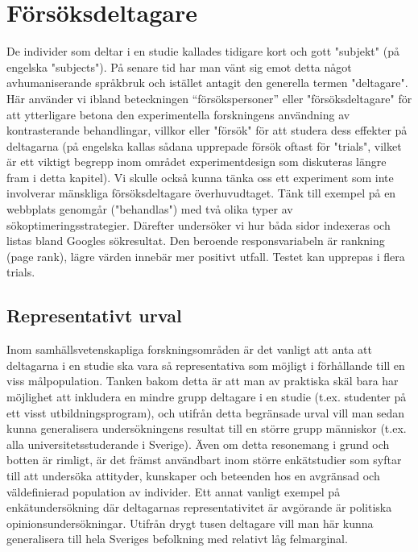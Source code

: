 \documentclass[
]{book}
\begin{document}
\hypertarget{sec07.2}{%
\section{Försöksdeltagare}\label{sec07.2}}

De individer som deltar i en studie kallades tidigare kort och gott "subjekt" (på engelska "subjects"). På senare tid har man vänt sig emot detta något avhumaniserande språkbruk och istället antagit den generella termen "deltagare". Här använder vi ibland beteckningen ``försökspersoner'' eller "försöksdeltagare" för att ytterligare betona den experimentella forskningens användning av kontrasterande behandlingar, villkor eller "försök" för att studera dess effekter på deltagarna (på engelska kallas sådana upprepade försök oftast för "trials", vilket är ett viktigt begrepp inom området experimentdesign som diskuteras längre fram i detta kapitel). Vi skulle också kunna tänka oss ett experiment som inte involverar mänskliga försöksdeltagare överhuvudtaget. Tänk till exempel på en webbplats genomgår ("behandlas") med två olika typer av sökoptimeringsstrategier. Därefter undersöker vi hur båda sidor indexeras och listas bland Googles sökresultat. Den beroende responsvariabeln är rankning (page rank), lägre värden innebär mer positivt utfall. Testet kan upprepas i flera trials.

\hypertarget{sub07.2.1}{%
\subsection{Representativt urval}\label{sub07.2.1}}

Inom samhällsvetenskapliga forskningsområden är det vanligt att anta att deltagarna i en studie ska vara så representativa som möjligt i förhållande till en viss målpopulation. Tanken bakom detta är att man av praktiska skäl bara har möjlighet att inkludera en mindre grupp deltagare i en studie (t.ex. studenter på ett visst utbildningsprogram), och utifrån detta begränsade urval vill man sedan kunna generalisera undersökningens resultat till en större grupp människor (t.ex. alla universitetsstuderande i Sverige). Även om detta resonemang i grund och botten är rimligt, är det främst användbart inom större enkätstudier som syftar till att undersöka attityder, kunskaper och beteenden hos en avgränsad och väldefinierad population av individer. Ett annat vanligt exempel på enkätundersökning där deltagarnas representativitet är avgörande är politiska opinionsundersökningar. Utifrån drygt tusen deltagare vill man här kunna generalisera till hela Sveriges befolkning med relativt låg felmarginal.
\end{document}
